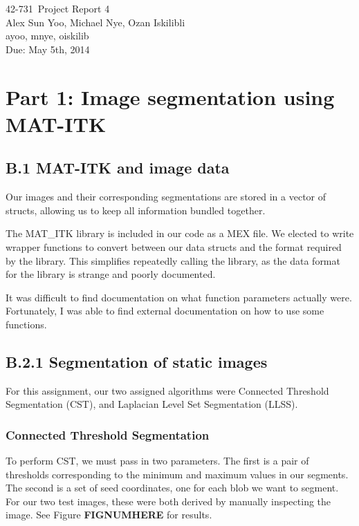 \documentclass{article}
\newcommand{\hmwkTitle}{Project Report 4}
\newcommand{\hmwkDueDate}{May 5th, 2014}
\newcommand{\hmwkClass}{42-731}
\newcommand{\hmwkAuthor}{Alex Sun Yoo, Michael Nye, Ozan Iskilibli}
\newcommand{\hmwkEmail}{ayoo, mnye, oiskilib}
\newcommand{\hmwkCollaborators}{}
\begin{document}
\thispagestyle{plain}
\begin{center}
{\Large \hmwkClass\ \hmwkTitle} \\
\hmwkAuthor \\
\hmwkEmail \\
\ifthenelse{\equal{\hmwkCollaborators}{}}{}{Collaborators: \hmwkCollaborators\\}
Due: \hmwkDueDate\\
\end{center}

\section*{Part 1: Image segmentation using MAT-ITK}

\subsection*{B.1 MAT-ITK and image data}

Our images and their corresponding segmentations are stored in a vector of structs, allowing us to keep all information bundled together.

The MAT\_ITK library is included in our code as a MEX file. We elected to write wrapper functions to convert between our data structs and the format required by the library. This simplifies repeatedly calling the library, as the data format for the library is strange and poorly documented.

It was difficult to find documentation on what function parameters actually were. Fortunately, I was able to find external documentation on how to use some functions\cite{designest}.


\subsection*{B.2.1 Segmentation of static images}

For this assignment, our two assigned algorithms were Connected Threshold Segmentation (CST), and Laplacian Level Set Segmentation (LLSS).

\subsubsection*{Connected Threshold Segmentation}
To perform CST, we must pass in two parameters. The first is a pair of thresholds corresponding to the minimum and maximum values in our segments. The second is a set of seed coordinates, one for each blob we want to segment. For our two test images, these were both derived by manually inspecting the image. See Figure {\bf FIGNUMHERE} for results.
\end{document}
